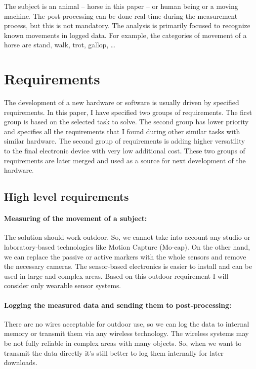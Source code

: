 The subject is an animal -- horse in this paper -- or human being or a moving machine. The post-processing can be done real-time during the measurement process, but this is not mandatory. The analysis is primarily focused to recognize known movements in logged data. For example, the categories of movement of a horse are stand, walk, trot, gallop, \dots

\section{Requirements}
\label{HWrequirements}
The development of a new hardware or software is usually driven by specified requirements. In this paper, I have specified two groups of requirements. The first group is based on the selected task to solve. The second group has lower priority and specifies all the requirements that I found during other similar tasks with similar hardware. The second group of requirements is adding higher versatility to the final electronic device with very low additional cost. These two groups of requirements are later merged and used as a source for next development of the hardware.

\subsection{High level requirements}

\paragraph{Measuring of the movement of a subject:} The solution should work outdoor. So, we cannot take into account any studio or laboratory-based technologies like Motion Capture (Mo-cap). On the other hand, we can replace the passive or active markers with the whole sensors and remove the necessary cameras. The sensor-based electronics is easier to install and can be used in large and complex areas. Based on this outdoor requirement I will consider only wearable sensor systems.

\paragraph{Logging the measured data and sending them to post-processing:} There are no wires acceptable for outdoor use, so we can log the data to internal memory or transmit them via any wireless technology. The wireless systems may be not fully reliable in complex areas with many objects. So, when we want to transmit the data directly it's still better to log them internally for later downloads.

